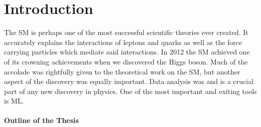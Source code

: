 \chapter*{Introduction}
The \ac{SM} is perhaps one of the most successful scientific theories ever created. It accurately explains the interactions of leptons and quarks as well as the force carrying particles which mediate said interactions. In 2012 the \ac{SM} achieved one of its crowning achievements when we discovered the Higgs boson. Much of the accolade was rightfully given to the theoretical work on the \ac{SM}, but another aspect of the discovery was equally important. Data analysis was and is a crucial part of any new discovery in physics. One of the most important and exiting tools is \ac{ML}.




\subsubsection*{Outline of the Thesis}




